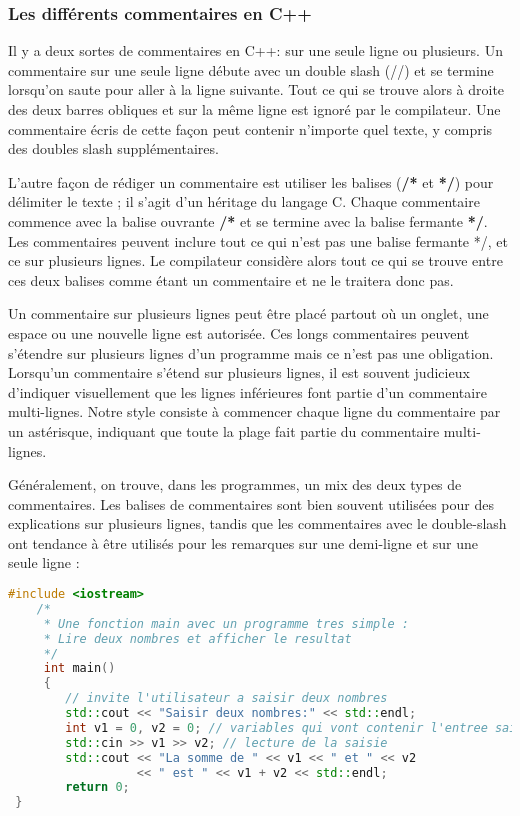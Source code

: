 \subsubsection{Les différents commentaires en C++}
Il y a deux sortes de commentaires en C++: sur une seule ligne ou plusieurs. Un commentaire sur une seule ligne débute avec un double slash (//) et se termine lorsqu'on saute pour aller à la ligne suivante. Tout ce qui se trouve alors à droite des deux barres obliques et sur la même ligne est ignoré par le compilateur. Une commentaire écris de cette façon peut contenir n'importe quel texte, y compris des doubles slash supplémentaires.

L'autre façon de rédiger un commentaire est utiliser les balises (\textbf{/*} et \textbf{*/}) pour délimiter le texte ; il s'agit d'un héritage du langage C. Chaque commentaire commence avec la balise ouvrante \textbf{/*} et se termine avec la balise fermante \textbf{*/}. Les commentaires peuvent inclure tout ce qui n'est pas une balise fermante */, et ce sur plusieurs lignes. Le compilateur considère alors tout ce qui se trouve entre ces deux balises comme étant un commentaire et ne le traitera donc pas.

Un commentaire sur plusieurs lignes peut être placé partout où un onglet, une espace ou une nouvelle ligne est autorisée. Ces longs commentaires peuvent s'étendre sur plusieurs lignes d'un programme mais ce n'est pas une obligation. Lorsqu'un commentaire s'étend sur plusieurs lignes, il est souvent judicieux d'indiquer visuellement que les lignes inférieures font partie d'un commentaire multi-lignes. Notre style consiste à commencer chaque ligne du commentaire par un astérisque, indiquant que toute la plage fait partie du commentaire multi-lignes.

Généralement, on trouve, dans les programmes, un mix des deux types de commentaires. Les balises de commentaires sont bien souvent utilisées pour des explications sur plusieurs lignes, tandis que les commentaires avec le double-slash ont tendance à être utilisés pour les remarques sur une demi-ligne et sur une seule ligne :

\medbreak
\begin{lstlisting}[language=C++]
	#include <iostream>
	/*
	 * Une fonction main avec un programme tres simple :
	 * Lire deux nombres et afficher le resultat
	 */
	 int main()
	 {
		// invite l'utilisateur a saisir deux nombres
		std::cout << "Saisir deux nombres:" << std::endl;
		int v1 = 0, v2 = 0; // variables qui vont contenir l'entree saisie
		std::cin >> v1 >> v2; // lecture de la saisie
		std::cout << "La somme de " << v1 << " et " << v2
			      << " est " << v1 + v2 << std::endl;
		return 0;	 
 }
\end{lstlisting}
\medbreak  

